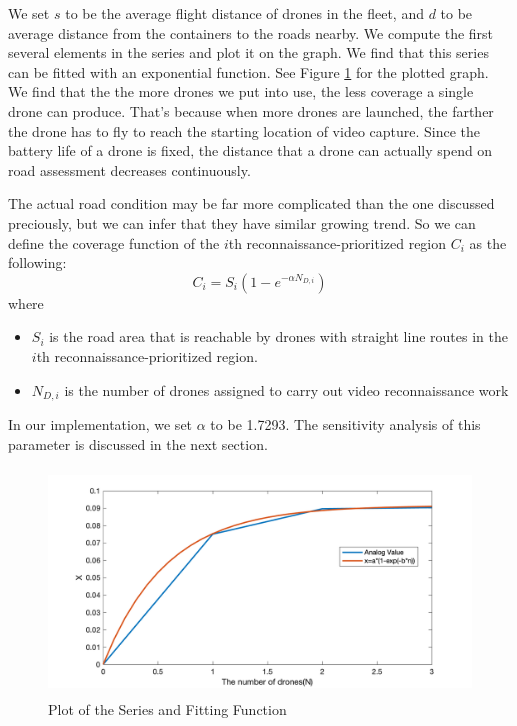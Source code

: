 \documentclass{mcmthesis}
\begin{document}
We set $s$ to be the average flight distance of drones in the fleet, and $d$ to be average distance from the containers to the roads nearby. We compute the first several elements in the series and plot it on the graph. We find that this series can be fitted with an exponential function. See Figure \ref{Fig:cvft} for the plotted graph. We find that the the more drones we put into use, the less coverage a single drone can produce. That's because when more drones are launched, the farther the drone has to fly to reach the starting location of video capture. Since the battery life of a drone is fixed, the distance that a drone can actually spend on road assessment decreases continuously. 

The actual road condition may be far more complicated than the one discussed preciously, but we can infer that they have similar growing trend. So we can define the coverage function of the $i$th reconnaissance-prioritized region $C_i$ as the following:
\begin{equation}
    C_i = S_i(1 - e^{-\alpha N_{D,i}})
\end{equation}
where 
\begin{itemize}
    \item $S_i$ is the road area that is reachable by drones with straight line routes in the $i$th reconnaissance-prioritized region. 
    \item $N_{D,i}$ is the number of drones assigned to carry out video reconnaissance work 
\end{itemize}
In our implementation, we set $\alpha$ to be 1.7293. The sensitivity analysis of this parameter is discussed in the next section.

\begin{figure}[htbp]
    \centering
    \includegraphics[width=12cm,height=6cm]{figures/alpha6.png}
    \caption{Plot of the Series and Fitting Function}
    \label{Fig:cvft}
\end{figure}
\end{document}
